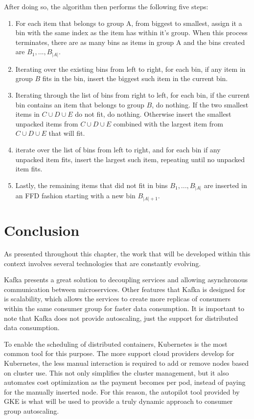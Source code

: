After doing so, the algorithm then performs the following five steps: 
\begin{enumerate}
    \item For each item that belongs to group A, from biggest to smallest, assign it a bin with the same index as the item has within it's group. When this process terminates, there are as many bins as items in group A and the bins created are $B_1, ..., B_{|A|}$.
    \item Iterating over the existing bins from left to right, for each bin, if any item in group $B$ fits in the bin, insert the biggest such item in the current bin.
    \item Iterating through the list of bins from right to left, for each bin, if the current bin contains an item that belongs to group $B$, do nothing. If the two smallest items in $C \cup D \cup E$ do not fit, do nothing. Otherwise insert the smallest unpacked items from $C \cup D \cup E$ combined with the largest item from $C \cup D \cup E$ that will fit.
    \item iterate over the list of bins from left to right, and for each bin if any unpacked item fits, insert the largest such item, repeating until no unpacked item fits.
    \item Lastly, the remaining items that did not fit in bins $B_1, ..., B_{|A|}$ are inserted in an FFD fashion starting with a new bin $B_{|A|+1}$. 
\end{enumerate}


\section{Conclusion}

As presented throughout this chapter, the work that will be developed within this context involves several technologies that are constantly evolving.

Kafka presents a great solution to decoupling services and allowing asynchronous communication between microservices. Other features that Kafka is designed for is scalability, which allows the services to create more replicas of consumers within the same consumer group for faster data consumption. It is important to note that Kafka does not provide autoscaling, just the support for distributed data consumption. 

To enable the scheduling of distributed containers, Kubernetes is the most common tool for this purpose. The more support cloud providers develop for Kubernetes, the less manual interaction is required to add or remove nodes based on cluster use. This not only simplifies the cluster management, but it also automates cost optimization as the payment becomes per pod, instead of paying for the manually inserted node. For this reason, the autopilot tool provided by GKE is what will be used to provide a truly dynamic approach to consumer group autoscaling.

